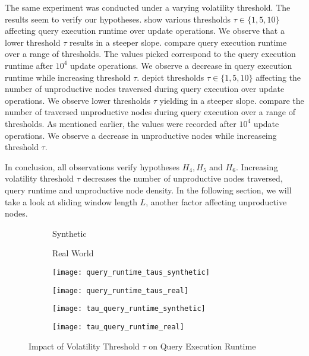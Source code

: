 \documentclass[abstracton,12pt]{scrartcl}
\theoremstyle{definition}
\begin{document}
The same experiment was conducted under a varying volatility threshold. The
results seem to verify our hypotheses.
 show
various thresholds $\tau \in \{1,5,10\}$ affecting query execution runtime
over update operations. We observe that a lower threshold $\tau$ results in a
steeper slope.
 compare query
execution runtime over a range of thresholds. The values picked correspond to
the query execution runtime after $10^4$ update operations.
We observe a decrease in query execution runtime while increasing threshold $\tau$.
depict thresholds $\tau \in \{1,5,10\}$ affecting the number of unproductive
nodes traversed during query execution over update operations. We observe lower
thresholds $\tau$ yielding in a steeper slope.
 compare the
number of traversed unproductive nodes during query execution over a range of
thresholds. As mentioned earlier, the values were recorded after $10^4$ update
operations. We observe a decrease in unproductive nodes while increaseing
threshold $\tau.$

In conclusion, all observations verify hypotheses $H_4, H_5$ and $H_6$.
Increasing volatility threshold $\tau$ decreases the number of unproductive
nodes traversed, query runtime and unproductive node density. In the following
section, we will take a look at sliding window length $L$, another factor
affecting unproductive nodes.

\begin{figure}[h]
  \centering
  \begin{subfigure}{0.49\linewidth}
    \centering
    Synthetic
  \end{subfigure}
  \begin{subfigure}{0.49\linewidth}
    \centering
    Real World
  \end{subfigure}
  \begin{subfigure}{0.49\linewidth}
    \centering
    \texttt{[image: query\_runtime\_taus\_synthetic]}
    \caption{}
    \label{fig:query_runtime_taus_synthetic}
  \end{subfigure}
  \begin{subfigure}{0.49\linewidth}
    \centering
    \texttt{[image: query\_runtime\_taus\_real]}
    \caption{}
    \label{fig:query_runtime_taus_real}
  \end{subfigure}
  \begin{subfigure}{0.49\linewidth}
    \centering
    \texttt{[image: tau\_query\_runtime\_synthetic]}
    \caption{}
    \label{fig:tau_query_runtime_synthetic}
  \end{subfigure}
  \begin{subfigure}{0.49\linewidth}
    \centering
    \texttt{[image: tau\_query\_runtime\_real]}
    \caption{}
    \label{fig:tau_query_runtime_real}
  \end{subfigure}
\caption{Impact of Volatility Threshold $\tau$ on Query Execution Runtime}
\end{figure}
\end{document}
